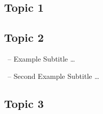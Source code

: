\subsection{Topic 1}
\begin{frame}{\myframetitle}
	\begin{mycolumns}
		\todots
	\mynextcolumn
		\todots
	\end{mycolumns}
\end{frame}

\subsection{Topic 2}
\begin{frame}{\myframetitle\ -- Example Subtitle}
	\ldots
\end{frame}

\begin{frame}{\myframetitle\ -- Second Example Subtitle}
	\ldots
\end{frame}

\subsection{Topic 3}

